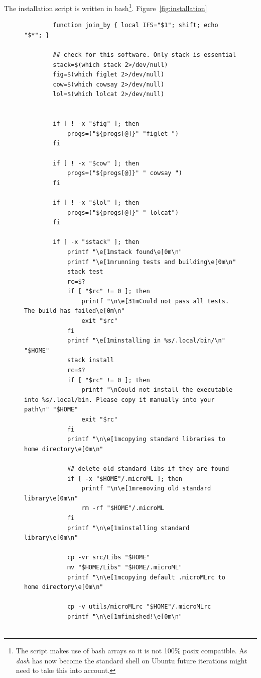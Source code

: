 The installation script is written in bash\footnote{The script makes use of bash arrays so it is not
100\% posix compatible. As \textit{dash} has now become the standard shell on Ubuntu future
iterations might need to take this into account.}. Figure~\ref{fig:installation}
\begin{figure}
    \begin{verbatim}
        function join_by { local IFS="$1"; shift; echo "$*"; }

        ## check for this software. Only stack is essential
        stack=$(which stack 2>/dev/null) 
        fig=$(which figlet 2>/dev/null)
        cow=$(which cowsay 2>/dev/null)
        lol=$(which lolcat 2>/dev/null)


        if [ ! -x "$fig" ]; then
            progs=("${progs[@]}" "figlet ")
        fi

        if [ ! -x "$cow" ]; then
            progs=("${progs[@]}" " cowsay ")
        fi

        if [ ! -x "$lol" ]; then
            progs=("${progs[@]}" " lolcat")
        fi

        if [ -x "$stack" ]; then
            printf "\e[1mstack found\e[0m\n"
            printf "\e[1mrunning tests and building\e[0m\n"
            stack test 
            rc=$?
            if [ "$rc" != 0 ]; then
                printf "\n\e[31mCould not pass all tests. The build has failed\e[0m\n"
                exit "$rc" 
            fi
            printf "\e[1minstalling in %s/.local/bin/\n" "$HOME"
            stack install
            rc=$?
            if [ "$rc" != 0 ]; then
                printf "\nCould not install the executable into %s/.local/bin. Please copy it manually into your path\n" "$HOME"
                exit "$rc"
            fi
            printf "\n\e[1mcopying standard libraries to home directory\e[0m\n"

            ## delete old standard libs if they are found
            if [ -x "$HOME"/.microML ]; then
                printf "\n\e[1mremoving old standard library\e[0m\n"
                rm -rf "$HOME"/.microML
            fi
            printf "\n\e[1minstalling standard library\e[0m\n"

            cp -vr src/Libs "$HOME"
            mv "$HOME/Libs" "$HOME/.microML"
            printf "\n\e[1mcopying default .microMLrc to home directory\e[0m\n"

            cp -v utils/microMLrc "$HOME"/.microMLrc
            printf "\n\e[1mfinished!\e[0m\n"


\end{verbatim}
\end{figure}
